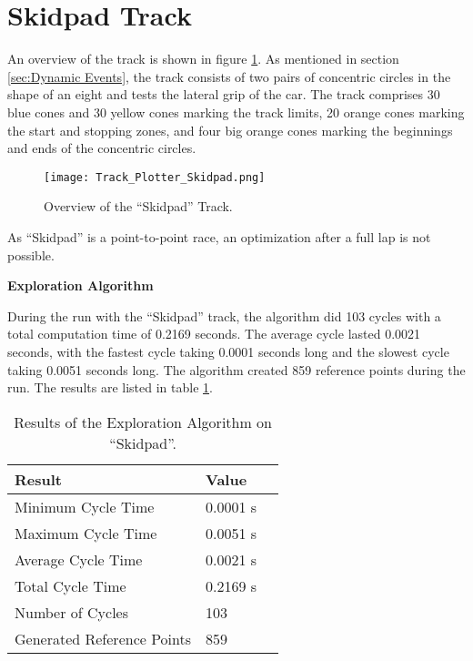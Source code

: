 \pagebreak

\section{Skidpad Track} \label{sec:Results Skidpad Track}
An overview of the track is shown in figure \ref{fig:Results Skidpad Initial}. As mentioned in section \ref{sec:Dynamic Events}, the track consists of two pairs of concentric circles in the shape of an eight and tests the lateral grip of the car. The track comprises 30 blue cones and 30 yellow cones marking the track limits, 20 orange cones marking the start and stopping zones, and four big orange cones marking the beginnings and ends of the concentric circles.
\begin{figure}[H]
    \centering
    \texttt{[image: Track\_Plotter\_Skidpad.png]}
    \caption{Overview of the ``Skidpad'' Track.}
    \label{fig:Results Skidpad Initial}
\end{figure}

As ``Skidpad'' is a point-to-point race, an optimization after a full lap is not possible.

\textbf{Exploration Algorithm}

During the run with the ``Skidpad'' track, the algorithm did 103 cycles with a total computation time of 0.2169 seconds. The average cycle lasted 0.0021 seconds, with the fastest cycle taking 0.0001 seconds long and the slowest cycle taking 0.0051 seconds long. The algorithm created 859 reference points during the run. The results are listed in table \ref{tab:Results Skidpad Exploration}.

\begin{table}[H]
    \centering
    \begin{tabular}{|l|l|l|}
        \hline
        \textbf{Result}            & \textbf{Value} \\ \hline
        Minimum Cycle Time         & 0.0001 s       \\ \hline
        Maximum Cycle Time         & 0.0051 s       \\ \hline
        Average Cycle  Time        & 0.0021 s       \\ \hline
        Total Cycle Time           & 0.2169 s       \\ \hline
        Number of Cycles           & 103            \\ \hline
        Generated Reference Points & 859            \\ \hline
    \end{tabular}
    \caption{Results of the Exploration Algorithm on ``Skidpad''.}
    \label{tab:Results Skidpad Exploration}
\end{table}

